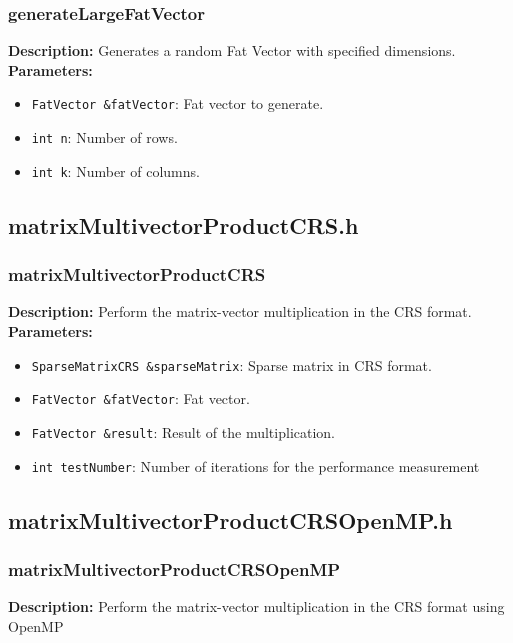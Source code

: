 \documentclass[12pt,oneside]{book} %
\begin{document}
\begin{subappendices}
    \subsubsection{generateLargeFatVector}
    \textbf{Description:} Generates a random Fat Vector with specified dimensions.\\

    \textbf{Parameters:}
    \begin{itemize}
        \item \texttt{FatVector \&fatVector}: Fat vector to generate.
        \item \texttt{int n}: Number of rows.
        \item \texttt{int k}: Number of columns.
    \end{itemize}

    \subsection{matrixMultivectorProductCRS.h}
    \subsubsection{matrixMultivectorProductCRS}
    \textbf{Description:} Perform the matrix-vector multiplication in the CRS format.\\

    \textbf{Parameters:}
    \begin{itemize}
        \item \texttt{SparseMatrixCRS \&sparseMatrix}: Sparse matrix in CRS format.
        \item \texttt{FatVector \&fatVector}: Fat vector.
        \item \texttt{FatVector \&result}: Result of the multiplication.
        \item \texttt{int testNumber}: Number of iterations for the performance measurement
    \end{itemize}

    \subsection{matrixMultivectorProductCRSOpenMP.h}
    \subsubsection{matrixMultivectorProductCRSOpenMP}
    \textbf{Description:} Perform the matrix-vector multiplication in the CRS format using OpenMP\\


\end{subappendices}
\end{document}
